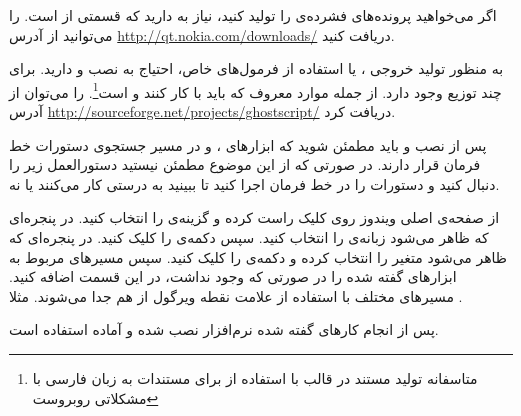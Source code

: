 \begin{sloppypar}
اگر می‌خواهید پرونده‌های فشرده‌ی  را تولید کنید، نیاز به  دارید که قسمتی از  
 است.  را می‌توانید از آدرس 
\url{http://qt.nokia.com/downloads/}
دریافت کنید.
\end{sloppypar}

\begin{sloppypar}
به منظور تولید خروجی ، یا استفاده از فرمول‌های خاص، احتیاج به نصب  و  دارید. 
برای  چند توزیع وجود دارد. از جمله موارد معروف که باید با  کار کنند  و  است\footnote{متاسفانه تولید مستند در قالب  با استفاده از  برای مستندات به زبان فارسی با مشکلاتی روبروست}.
 را می‌توان از آدرس 
\url{http://sourceforge.net/projects/ghostscript/} 
 دریافت کرد.
\end{sloppypar}

پس از نصب  و  باید مطمئن شوید که ابزارهای ،  و  در مسیر جستجوی دستورات خط فرمان قرار دارند. در صورتی که از این موضوع مطمئن نیستید دستورالعمل زیر را دنبال کنید 
و دستورات را در خط فرمان اجرا کنید تا ببینید به درستی کار می‌کنند یا نه.

\begin{sloppypar}
از صفحه‌ی اصلی ویندوز روی  کلیک راست کرده و گزینه‌ی  را انتخاب کنید. 
 در پنجره‌ای که ظاهر می‌شود زبانه‌ی  را انتخاب کنید. سپس دکمه‌ی  را کلیک کنید. 
 در پنجره‌ای که ظاهر می‌شود متغیر  را انتخاب کرده و دکمه‌ی  را کلیک کنید. 
 سپس مسیرهای مربوط به ابزارهای گفته شده را در صورتی که وجود نداشت، در این قسمت اضافه کنید. 
 مسیرهای مختلف با استفاده از علامت نقطه ویرگول از هم جدا می‌شوند. مثلا 
.
\end{sloppypar}

پس از انجام کارهای گفته شده نرم‌افزار  نصب شده و آماده استفاده است.